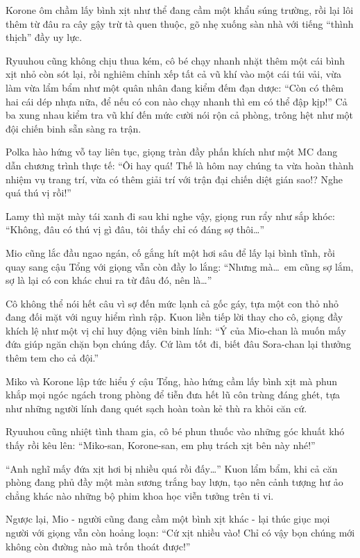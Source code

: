 \documentclass[../main.tex]{subfiles}
\begin{document}
Korone ôm chầm lấy bình xịt như thể đang cầm một khẩu súng trường, rồi lại lôi thêm từ đâu ra cây gậy trừ tà quen thuộc, gõ nhẹ xuống sàn nhà với tiếng ``thình thịch'' đầy uy lực.

Ryuuhou cũng không chịu thua kém, cô bé chạy nhanh nhặt thêm một cái bình xịt nhỏ còn sót lại, rồi nghiêm chỉnh xếp tất cả vũ khí vào một cái túi vải, vừa làm vừa lẩm bẩm như một quân nhân đang kiểm đếm đạn dược: ``Còn có thêm hai cái dép nhựa nữa, để nếu có con nào chạy nhanh thì em có thể đập kịp!'' Cả ba xung nhau kiểm tra vũ khí đến mức cười nói rộn cả phòng, trông hệt như một đội chiến binh sẵn sàng ra trận.

Polka hào hứng vỗ tay liên tục, giọng tràn đầy phấn khích như một MC đang dẫn chương trình thực tế: ``Ôi hay quá! Thế là hôm nay chúng ta vừa hoàn thành nhiệm vụ trang trí, vừa có thêm giải trí với trận đại chiến diệt gián sao!? Nghe quá thú vị rồi!''

Lamy thì mặt mày tái xanh đi sau khi nghe vậy, giọng run rẩy như sắp khóc: ``Không, đâu có thú vị gì đâu, tôi thấy chỉ có đáng sợ thôi\dots''

Mio cũng lắc đầu ngao ngán, cố gắng hít một hơi sâu để lấy lại bình tĩnh, rồi quay sang cậu Tổng với giọng vẫn còn đầy lo lắng: ``Nhưng mà\dots\ em cũng sợ lắm, sợ là lại có con khác chui ra từ đâu đó, nên là\dots''

Cô không thể nói hết câu vì sợ đến mức lạnh cả gốc gáy, tựa một con thỏ nhỏ đang đối mặt với nguy hiểm rình rập. Kuon liền tiếp lời thay cho cô, giọng đầy khích lệ như một vị chỉ huy động viên binh lính: ``Ý của Mio-chan là muốn mấy đứa giúp ngăn chặn bọn chúng đấy. Cứ làm tốt đi, biết đâu Sora-chan lại thưởng thêm tem cho cả đội.''

Miko và Korone lập tức hiểu ý cậu Tổng, hào hứng cầm lấy bình xịt mà phun khắp mọi ngóc ngách trong phòng để tiễn đưa hết lũ côn trùng đáng ghét, tựa như những người lính đang quét sạch hoàn toàn kẻ thù ra khỏi căn cứ.


Ryuuhou cũng nhiệt tình tham gia, cô bé phun thuốc vào những góc khuất khó thấy rồi kêu lên: ``Miko-san, Korone-san, em phụ trách xịt bên này nhé!''

``Anh nghĩ mấy đứa xịt hơi bị nhiều quá rồi đấy\dots'' Kuon lẩm bẩm, khi cả căn phòng đang phủ đầy một màn sương trắng bay lượn, tạo nên cảnh tượng hư ảo chẳng khác nào những bộ phim khoa học viễn tưởng trên ti vi.

Ngược lại, Mio - người cũng đang cầm một bình xịt khác - lại thúc giục mọi người với giọng vẫn còn hoảng loạn: ``Cứ xịt nhiều vào! Chỉ có vậy bọn chúng mới không còn đường nào mà trốn thoát được!''
\end{document}
